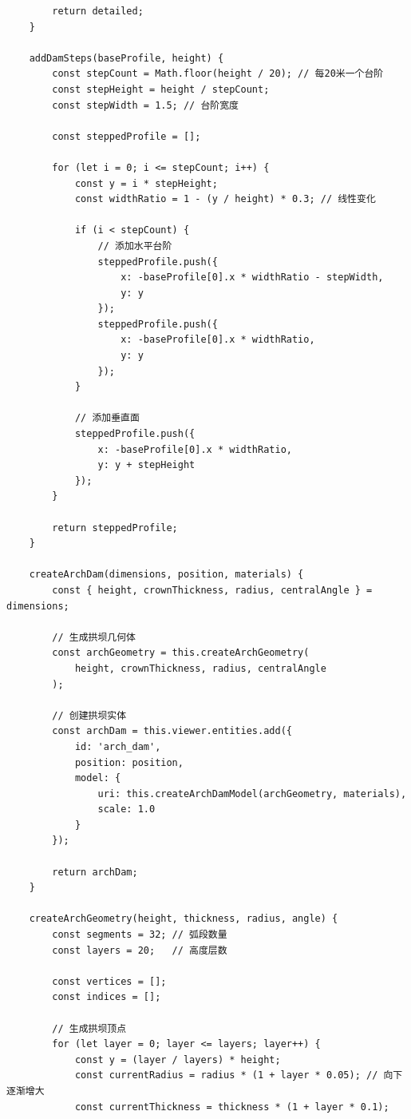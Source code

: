 \begin{lstlisting}
        return detailed;
    }
    
    addDamSteps(baseProfile, height) {
        const stepCount = Math.floor(height / 20); // 每20米一个台阶
        const stepHeight = height / stepCount;
        const stepWidth = 1.5; // 台阶宽度
        
        const steppedProfile = [];
        
        for (let i = 0; i <= stepCount; i++) {
            const y = i * stepHeight;
            const widthRatio = 1 - (y / height) * 0.3; // 线性变化
            
            if (i < stepCount) {
                // 添加水平台阶
                steppedProfile.push({
                    x: -baseProfile[0].x * widthRatio - stepWidth,
                    y: y
                });
                steppedProfile.push({
                    x: -baseProfile[0].x * widthRatio,
                    y: y
                });
            }
            
            // 添加垂直面
            steppedProfile.push({
                x: -baseProfile[0].x * widthRatio,
                y: y + stepHeight
            });
        }
        
        return steppedProfile;
    }
    
    createArchDam(dimensions, position, materials) {
        const { height, crownThickness, radius, centralAngle } = dimensions;
        
        // 生成拱坝几何体
        const archGeometry = this.createArchGeometry(
            height, crownThickness, radius, centralAngle
        );
        
        // 创建拱坝实体
        const archDam = this.viewer.entities.add({
            id: 'arch_dam',
            position: position,
            model: {
                uri: this.createArchDamModel(archGeometry, materials),
                scale: 1.0
            }
        });
        
        return archDam;
    }
    
    createArchGeometry(height, thickness, radius, angle) {
        const segments = 32; // 弧段数量
        const layers = 20;   // 高度层数
        
        const vertices = [];
        const indices = [];
        
        // 生成拱坝顶点
        for (let layer = 0; layer <= layers; layer++) {
            const y = (layer / layers) * height;
            const currentRadius = radius * (1 + layer * 0.05); // 向下逐渐增大
            const currentThickness = thickness * (1 + layer * 0.1);
            

\end{lstlisting}
